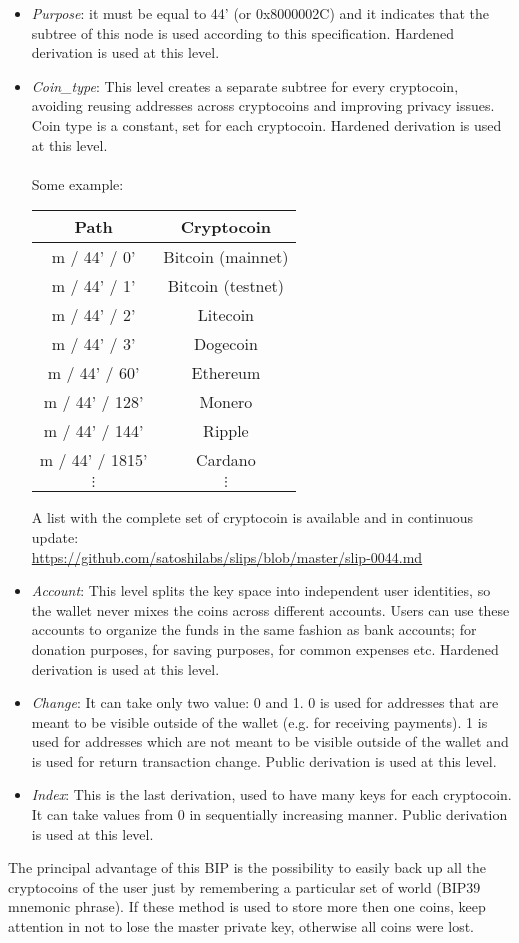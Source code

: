 \begin{itemize}
	\item \textit{Purpose}: it must be equal to 44' (or 0x8000002C)  and it indicates that the subtree of this node is used according to this specification. Hardened derivation is used at this level.
	\item \textit{Coin\_type}: This level creates a separate subtree for every cryptocoin, avoiding reusing addresses across cryptocoins and improving privacy issues. Coin type is a constant, set for each cryptocoin. Hardened derivation is used at this level.
	\\ \\
	Some example:
	\begin{center}
		\begin{tabular}{|| c | c ||} 
			\hline
			Path & Cryptocoin  \\ [0.5ex] 
			\hline\hline
			m / 44' / 0' & Bitcoin (mainnet) \\ 
			m / 44' / 1' & Bitcoin (testnet) \\			
			m / 44' / 2' & Litecoin \\			
			m / 44' / 3' & Dogecoin \\			
			m / 44' / 60' & Ethereum  \\ 
			m / 44' / 128' & Monero  \\
			m / 44' / 144' & Ripple  \\ 
			m / 44' / 1815' & Cardano  \\  
			$\vdots $& $\vdots $  \\ 
			\hline
		\end{tabular}
	\end{center}
	A list with the complete set of cryptocoin is available and in continuous update: \\ \url{https://github.com/satoshilabs/slips/blob/master/slip-0044.md }
	
	\item \textit{Account}: This level splits the key space into independent user identities, so the wallet never mixes the coins across different accounts.
	Users can use these accounts to organize the funds in the same fashion as bank accounts; for donation purposes, for saving purposes, for common expenses etc.
	Hardened derivation is used at this level.
	\item \textit{Change}: It can take only two value: 0 and 1. 0 is used for addresses that are meant to be visible outside of the wallet (e.g. for receiving payments). 1 is used for addresses which are not meant to be visible outside of the wallet and is used for return transaction change.
	Public derivation is used at this level.
	\item \textit{Index}: This is the last derivation, used to have many keys for each cryptocoin. It can take values from 0 in sequentially increasing manner. Public derivation is used at this level.
\end{itemize}
The principal advantage of this BIP is the possibility to easily back up all the cryptocoins of the user just by remembering a particular set of world (BIP39 mnemonic phrase). If these method is used to store more then one coins, keep attention in not to lose the master private key, otherwise all coins were lost.

